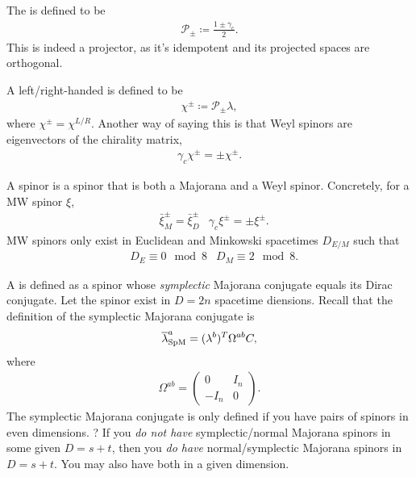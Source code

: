 \documentclass[11pt]{article}
\begin{document}
\begin{definition}
    The  is defined to be
    \begin{align*}
        \mathcal{P}_{\pm} \coloneqq \frac{1 \pm \gamma_c}{2}.
    \end{align*}
    This is indeed a projector, as it's idempotent and
    its projected spaces are orthogonal.
\end{definition}

\begin{definition}
    A left/right-handed  is defined to be
    \begin{align*}
        \chi^{\pm} \coloneqq \mathcal{P}_{\pm} \lambda,
    \end{align*}
    where $\chi^{\pm} = \chi^{L/R}$. Another way of saying this 
    is that Weyl spinors are eigenvectors of the chirality matrix,
    \begin{align*}
        \gamma_c \chi^{\pm} = \pm \chi^{\pm}.
    \end{align*}
\end{definition}

\begin{definition}
    A  spinor is a spinor that is both a
    Majorana and a Weyl spinor. Concretely, for a MW spinor $\xi$,
    \begin{align*}
        & \bar{\xi}^{\pm}_M = \bar{\xi}^{\pm}_D
        & \gamma_c \xi^{\pm} = \pm \xi^{\pm}.
    \end{align*}
    MW spinors only exist in Euclidean and Minkowski spacetimes $D_{E/M}$ 
    such that
    \begin{align*}
        & D_E \equiv 0 \mod 8
        & D_M \equiv 2 \mod 8.
    \end{align*}

\end{definition}

\begin{definition}
    A  is defined as a spinor
    whose \emph{symplectic} Majorana conjugate equals its Dirac conjugate.
    Let the spinor exist in $D = 2n$ spacetime diensions.
    Recall that the definition of the symplectic Majorana conjugate is
    \begin{align*}
        \bar{\lambda}_{\rm SpM}^a = (\lambda^b)^T \Omega^{ab} C,
    \end{align*}
    where
    \begin{align*}
        \Omega^{ab} = \begin{pmatrix}
            0 & I_n\\
            - I_n & 0
        \end{pmatrix}.
    \end{align*}
    The symplectic Majorana conjugate is only defined if you have
    pairs of spinors in even dimensions. ?
    If you \emph{do not have} symplectic/normal Majorana
    spinors in some given $D = s + t$, then you \emph{do
    have} normal/symplectic Majorana spinors in $D = s + t$.
    You may also have both in a given dimension.
\end{definition}
\end{document}
